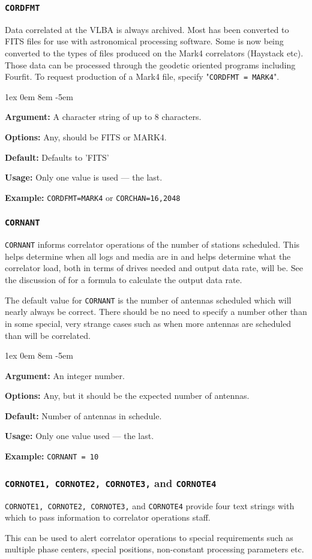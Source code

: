 \documentclass{report}
\newcommand{\rcwbox}[5]{
  \begin{list}{}{\parsep 1ex  \itemsep 0em
                 \leftmargin 8em  \itemindent -5em }
    \item {\bf Argument:} #1
    \item {\bf Options:}  #2
    \item {\bf Default:}  #3
    \item {\bf Usage:}    #4
    \item {\bf Example:}  #5
  \end{list}
}
\begin{document}
\subsubsection{\label{MP:CORDFMT}{\tt CORDFMT}}

Data correlated at the VLBA is always archived.  Most has been
converted to FITS files for use with astronomical processing software.
Some is now being converted to the types of files produced on the
Mark4 correlators (Haystack etc).  Those data can be processed through
the geodetic oriented programs including Fourfit.  To request production
of a Mark4 file, specify "{\tt CORDFMT = MARK4}".

\rcwbox
{A character string of up to 8 characters.}
{Any, should be FITS or MARK4.}
{Defaults to 'FITS'}
{Only one value is used --- the last.}
{{\tt CORDFMT=MARK4} or {\tt CORCHAN=16,2048}}


\subsubsection{\label{MP:CORNANT}{\tt CORNANT}}

{\tt CORNANT} informs correlator operations of the number of stations
scheduled.  This helps determine when all logs and media are in and
helps determine what the correlator load, both in terms of drives
needed and output data rate, will be.  See the discussion of
 for a formula to calculate
the output data rate.

The default value for {\tt CORNANT} is the number of antennas scheduled
which will nearly always be correct.  There should be no need to specify
a number other than in some special, very strange cases such as when more
antennas are scheduled than will be correlated.

\rcwbox
{An integer number.}
{Any, but it should be the expected number of antennas.}
{Number of antennas in schedule.}
{Only one value used --- the last.}
{{\tt CORNANT = 10}}


\subsubsection{\label{MP:CORNOTE}
{\tt CORNOTE1, CORNOTE2, CORNOTE3,} and {\tt CORNOTE4}}

{\tt CORNOTE1, CORNOTE2, CORNOTE3,} and {\tt CORNOTE4} provide four
text strings with which to pass information to correlator operations
staff.

This can be used to alert correlator operations to special
requirements such as multiple phase centers, special positions,
non-constant processing parameters etc.
\end{document}
